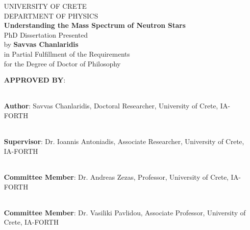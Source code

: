 \documentclass[main.tex]{subfiles}
\begin{document}
\newpage
    \thispagestyle{empty}
    \begin{center}
        UNIVERSITY OF CRETE \\
        \vspace{0.25cm}
        DEPARTMENT OF PHYSICS \\
        \vspace{0.5cm}
        \textbf{Understanding the Mass Spectrum of Neutron Stars} \\
        \vspace{0.5cm}
        PhD Dissertation Presented \\
        \vspace{0.5cm}
        by \textbf{Savvas Chanlaridis} \\
        \vspace{0.5cm}
        in Partial Fulfillment of the Requirements \\
        \vspace{0.5cm}
        for the Degree of Doctor of Philosophy
    \end{center}
     \vspace{0.8cm}
     
    \noindent \textbf{APPROVED BY}:\\
    \vspace*{1.5cm}
    
    \noindent\hrulefill \\
    \noindent\textbf{Author}: Savvas Chanlaridis, Doctoral Researcher, University of Crete, IA-FORTH \\
    \vspace*{1cm}
    
    \noindent\hrulefill \\
    \noindent\textbf{Supervisor}: Dr. Ioannis Antoniadis, Associate Researcher, University of Crete, IA-FORTH \\
    \vspace*{1cm}    
    
    \noindent\hrulefill \\
    \noindent\textbf{Committee Member}: Dr. Andreas Zezas, Professor, University of Crete, IA-FORTH \\
    \vspace*{1cm}    
    
    \noindent\hrulefill \\
    \noindent\textbf{Committee Member}: Dr. Vasiliki Pavlidou, Associate Professor, University of Crete, IA-FORTH \\
    \vspace*{1cm}    
    
\end{document}
